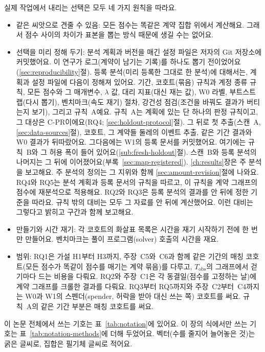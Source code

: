 실제 작업에서 내리는 선택은 모두 네 가지 원칙을 따라요.
\begin{itemize}
\item 같은 씨앗으로 견줄 수 있음: 모든 점수는 똑같은 계약 집합 위에서 계산해요. 그래서 점수 사이의 차이가 표본을 뽑는 방식 때문에 생길 수는 없어요.
\item 선택을 미리 정해 두기: 분석 계획과 버전을 매긴 설정 파일은 저자의 Git 저장소에 커밋했어요. 이 연구가 로그(계약이 남기는 기록)를 하나도 뽑기 전이었어요(\ref{sec:reproducibility}절). 등록 분석(미리 등록한 그대로 한 분석)에 대해서는, 계획과 설정 파일에 다음이 정해져 있어요. 기간, 코호트(묶음) 규칙과 계정 종류 규칙, 모든 점수와 그 매개변수, $\lambda$ 값, 대리 지표(대신 재는 값), W0 라벨, 부트스트랩(다시 뽑기), 벤치마크(속도 재기) 절차, 강건성 점검(조건을 바꿔도 결과가 버티는지 보기), 그리고 규칙~A예요. 규칙~A는 계획에 있는 단 하나의 판정 규칙이고, 그 대상은 \mbox{C-PR}이에요(RQ4; \ref{sec:holdout-protocol}절). 그 뒤로 첫 추출(스캔~A, \ref{sec:data-sources}절), 코호트, 그 계약들 둘레의 이벤트 추출, 같은 기간 결과와 W0 결과가 뒤따랐어요. 그다음에는 W1의 등록 문서를 커밋했어요. 여기에는 규칙~B와 그 허용 폭이 들어 있어요(\ref{sub:fresh-holdout}절). 스캔~B와 등록 분석의 나머지는 그 뒤에 이어졌어요(부록~\ref{sec:map-registered}). \ref{ch:results}장은 주 분석을 보고해요. 주 분석의 정의는 그 지위와 함께 \ref{sec:amount-revision}절에 나와요. RQ4와 RQ5는 분석 계획과 등록 문서의 규칙을 따르고, 이 규칙을 계약 그래프의 점수에 재분석으로 적용해요. RQ2와 RQ3은 등록 분석의 결과를 안 뒤에 정한 기준을 따라요. 규칙 밖의 대비는 모두 그 자료를 안 뒤에 계산했어요. 이런 대비는 그렇다고 밝히고 구간과 함께 보고해요.
\item 만들기와 시간 재기: 각 코호트의 화살표 목록은 시간을 재기 시작하기 전에 한 번만 만들어요. 벤치마크는 풀이 프로그램(solver) 호출의 시간을 재요.
\item 범위: RQ1은 가설 H1부터 H3까지, 주장~C5와~C6과 함께 같은 기간의 매칭 코호트(모든 점수가 똑같이 점수를 매기는 계약 묶음)를 다루고, $T_{\mathrm{obs}}$의 그래프에서 걷기마다 드는 비용을 다뤄요. RQ2와 주장~C1은 각 동결일(점수를 고정하는 날)에 계약 그래프를 크롤한 결과를 다뤄요. RQ3부터 RQ5까지와 주장~C2부터~C4까지는 W0과 W1의 스펜더(spender, 허락을 받아 대신 쓰는 쪽) 코호트를 써요. 규칙~A의 같은 기간 부분은 매칭 코호트를 써요.
\end{itemize}


이 논문 전체에서 쓰는 기호는 표~\ref{tab:notation}에 있어요. 이 장의 식에서만 쓰는 기호는 표~\ref{tab:notation-methods}에 더해 두었어요. 벡터(수를 줄지어 늘어놓은 것)는 굵은 글씨로, 집합은 필기체 글씨로 적어요.

